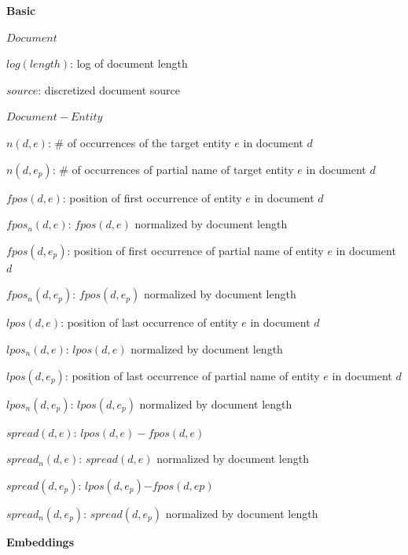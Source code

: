 \documentclass{article}
\begin{document}
\begin{itemize*}
  \item \textbf{Basic}
    \begin{itemize*}
      \item $Document$
        \begin{itemize*}
            \item $log(length)$: log of document length
            \item $source$: discretized document source
        \end{itemize*}
      \item $Document-Entity$
        \begin{itemize*}
            \item $n(d,e)$: \# of occurrences of the target entity $e$ in document $d$
            \item $n(d,e_p)$: \# of occurrences of partial name of target entity $e$ in document $d$
            \item $fpos(d,e)$: position of first occurrence of entity $e$ in document $d$
            \item $fpos_n(d,e)$: $fpos(d,e)$ normalized by document length
            \item $fpos(d,e_p)$: position of first occurrence of partial name of entity $e$ in document $d$
            \item $fpos_n(d,e_p)$: $fpos(d,e_p)$ normalized by document length
            \item $lpos(d,e)$: position of last occurrence of entity $e$ in document $d$
            \item $lpos_n(d,e)$: $lpos(d,e)$ normalized by document length
            \item $lpos(d,e_p)$: position of last occurrence of partial name of entity $e$ in document $d$
            \item $lpos_n(d,e_p)$: $lpos(d,e_p)$ normalized by document length
            \item $spread(d,e)$: $lpos(d,e) - fpos(d,e)$
            \item $spread_n(d,e)$: $spread(d,e)$ normalized by document length
            \item $spread(d,e_p)$: $lpos(d,e_p)\mathord{-}fpos(d,ep)$
            \item $spread_n(d,e_p)$: $spread(d,e_p)$ normalized by document length
        \end{itemize*}
    \end{itemize*}
  \item \textbf{Embeddings}

\end{itemize*}
\end{document}
